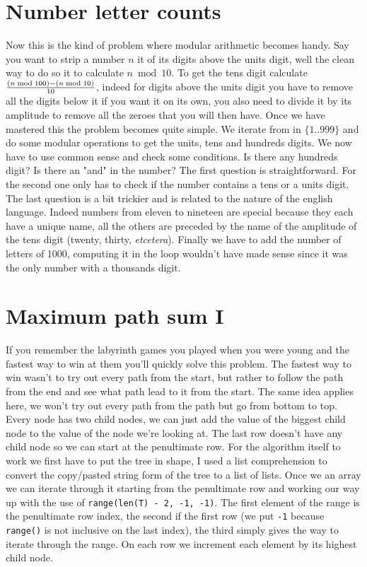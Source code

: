 \documentclass[11pt]{article}
\begin{document}
\section{Number letter counts} 
Now this is the kind of problem where modular arithmetic becomes handy. Say you want to strip a number $n$ it of its digits above the units digit, well the clean way to do so it to calculate $n\bmod 10$. To get the tens digit calculate $(n\bmod 100)-(n\bmod 10) \over 10$, indeed for digits above the units digit you have to remove all the digits below it if you want it on its own, you also need to divide it by its amplitude to remove all the zeroes that you will then have. Once we have mastered this the problem becomes quite simple. We iterate from in $\{1..999\}$ and do some modular operations to get the units, tens and hundreds digits. We now have to use common sense and check some conditions. Is there any hundreds digit? Is there an "and" in the number? The first question is straightforward. For the second one only has to check if the number contains a tens or a units digit. The last question is a bit trickier and is related to the nature of the english language. Indeed numbers from eleven to nineteen are special because they each have a unique name, all the others are preceded by the name of the amplitude of the tens digit (twenty, thirty, \emph{etcetera}). Finally we have to add the number of letters of 1000, computing it in the loop wouldn't have made sense since it was the only number with a thousands digit.

\section{Maximum path sum I} 
If you remember the labyrinth games you played when you were young and the fastest way to win at them you'll quickly solve this problem. The fastest way to win wasn't to try out every path from the start, but rather to follow the path from the end and see what path lead to it from the start. The same idea applies here, we won't try out every path from the path but go from bottom to top. Every node has two child nodes, we can just add the value of the biggest child node to the value of the node we're looking at. The last row doesn't have any child node so we can start at the penultimate row. For the algorithm itself to work we first have to put the tree in shape, I used a list comprehension to convert the copy/pasted string form of the tree to a list of lists. Once we an array we can iterate through it starting from the penultimate row and working our way up with the use of \texttt{range(len(T) - 2, -1, -1)}. The first element of the range is the penultimate row index, the second if the first row (we put \texttt{-1} because \texttt{range()} is not inclusive on the last index), the third simply gives the way to iterate through the range. On each row we increment each element by its highest child node.
\end{document}
